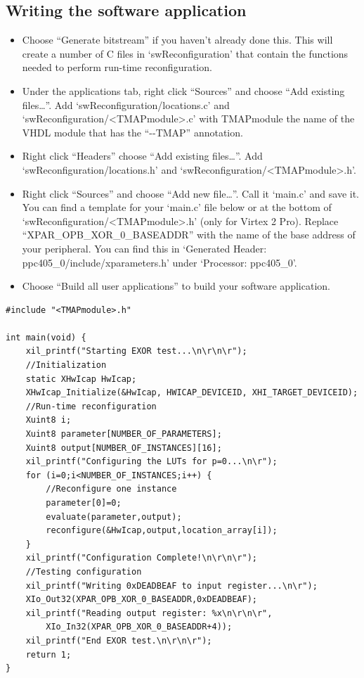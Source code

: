\documentclass[a4paper,oneside]{memoir}
\begin{document}
\subsection{Writing the software application}\label{sec:writing_software}
\begin{itemize}
\item Choose ``Generate bitstream'' if you haven't already done this. This will create a number of C files in `swReconfiguration' that  contain the functions needed to perform run-time reconfiguration.
\item Under the applications tab, right click ``Sources'' and choose ``Add existing files\dots''. Add `swReconfiguration/locations.c' and `swReconfiguration/<TMAPmodule>.c' with TMAPmodule the name of the VHDL module that has the ``-\--TMAP'' annotation.
\item Right click ``Headers'' choose ``Add existing files\dots''. Add `swReconfiguration/locations.h' and `swReconfiguration/<TMAPmodule>.h'.
\item Right click ``Sources'' and choose ``Add new file\dots''. Call it `main.c' and save it.\\
You can find a template for your `main.c' file below or at the bottom of `swReconfiguration/<TMAPmodule>.h' (only for Virtex 2 Pro). Replace ``XPAR\_OPB\_XOR\_0\_BASEADDR'' with the name of the base address of your peripheral. You can find this in `Generated Header: ppc405\_0/include/xparameters.h' under  `Processor: ppc405\_0'.
\item Choose ``Build all user applications'' to build your software application.
\end{itemize}

\lstset{language=[ansi]C,showstringspaces=false}
\begin{lstlisting}
#include "<TMAPmodule>.h"

int main(void) {
	xil_printf("Starting EXOR test...\n\r\n\r");
	//Initialization
	static XHwIcap HwIcap;
	XHwIcap_Initialize(&HwIcap, HWICAP_DEVICEID, XHI_TARGET_DEVICEID);
	//Run-time reconfiguration
	Xuint8 i;
	Xuint8 parameter[NUMBER_OF_PARAMETERS];
	Xuint8 output[NUMBER_OF_INSTANCES][16];
	xil_printf("Configuring the LUTs for p=0...\n\r");
	for (i=0;i<NUMBER_OF_INSTANCES;i++) {
		//Reconfigure one instance
		parameter[0]=0;
		evaluate(parameter,output);
		reconfigure(&HwIcap,output,location_array[i]);
	}
	xil_printf("Configuration Complete!\n\r\n\r");
	//Testing configuration
	xil_printf("Writing 0xDEADBEAF to input register...\n\r");
	XIo_Out32(XPAR_OPB_XOR_0_BASEADDR,0xDEADBEAF);
	xil_printf("Reading output register: %x\n\r\n\r", 
		XIo_In32(XPAR_OPB_XOR_0_BASEADDR+4));
	xil_printf("End EXOR test.\n\r\n\r");
	return 1;
}
\end{lstlisting}
\end{document}
